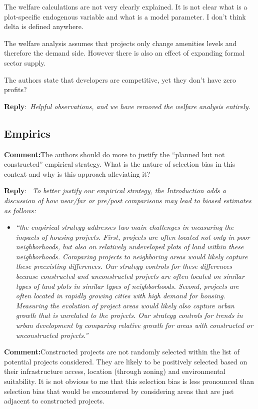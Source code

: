 \documentclass{article}
\newcommand{\reply}{\medskip \noindent \textbf{Reply}:\ \textit }
\newcommand{\sr}{\begin{minipage}{\dimexpr\textwidth-3cm}}
\newcommand{\er}{\end{minipage}}
\newcommand{\cc}{\medskip \noindent \textbf{Comment:}\hspace{2em}}
\begin{document}
The welfare calculations are not very clearly explained. It is not clear what is a plot-specific endogenous variable and what is a model parameter. I don’t think delta is defined anywhere.

The welfare analysis assumes that projects only change amenities levels and therefore the demand side. However there is also an effect of expanding formal sector supply.

The authors state that developers are competitive, yet they don’t have zero profits?

\sr
\reply{Helpful observations, and we have removed the welfare analysis entirely.}\\
\er

\subsection{Empirics}

\cc The authors should do more to justify the “planned but not constructed” empirical strategy. What is the nature of selection bias in this context and why is this approach alleviating it? 

\sr
\reply{  To better justify our empirical strategy, the Introduction adds a discussion of how near/far or pre/post comparisons may lead to biased estimates as follows: }
\begin{itemize}
\item \textit{``the empirical strategy addresses two main challenges in measuring the impacts of housing projects.  First, projects are often located not only in poor neighborhoods, but also on relatively undeveloped plots of land within these neighborhoods.  Comparing projects to neighboring areas would likely capture these preexisting differences.  Our strategy controls for these differences because constructed and unconstructed projects are often located on similar types of land plots in similar types of neighborhoods.  Second, projects are often located in rapidly growing cities with high demand for housing.  Measuring the evolution of project areas would likely also capture urban growth that is unrelated to the projects.  Our strategy controls for trends in urban development by comparing relative growth for areas with constructed or unconstructed projects.'' }
\end{itemize}
\er

\cc Constructed projects are not randomly selected within the list of potential projects considered. They are likely to be positively selected based on their infrastructure access, location (through zoning) and environmental suitability. It is not obvious to me that this selection bias is less pronounced than selection bias that would be encountered by considering areas that are just adjacent to constructed projects.
\end{document}
